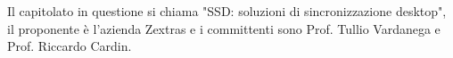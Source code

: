     Il capitolato in questione si chiama "SSD: soluzioni di sincronizzazione desktop", il proponente \`{e} l'azienda Zextras e i committenti sono Prof. Tullio Vardanega e Prof. Riccardo Cardin.
